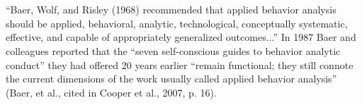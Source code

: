 \chapter{\foursecb{}}
\section[\fourbOne{}]{\fourbOne{}%
            }
``Baer, Wolf, and Risley (1968) recommended that applied behavior analysis should be applied, behavioral, analytic, technological, conceptually systematic, effective, and capable of appropriately generalized outcomes...'' In 1987 Baer and colleagues reported that the ``seven self-conscious guides to behavior analytic conduct'' they had offered 20 years earlier ``remain functional; they still connote the current dimensions of the work usually called applied behavior analysis'' (Baer, et al., cited in Cooper et al., 2007, p. 16).
